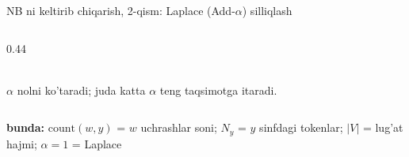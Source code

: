 \documentclass[aspectratio=169,11pt]{beamer}
\newcommand{\bunda}[1]{{\small\textbf{bunda:}\; #1}}
\begin{document}
\begin{frame}{NB ni keltirib chiqarish, 2-qism: Laplace (Add-$\alpha$) silliqlash}
\begin{columns}[T]
\begin{column}{0.44\textwidth}
\\[1pt]
      {\scriptsize\textcolor{halfgray}{$\alpha$ nolni ko'taradi; juda katta $\alpha$ teng taqsimotga itaradi.}}
    \end{column}
  \end{columns}
  \vspace{2pt}
  \bunda{%
    \footnotesize $\mathrm{count}(w,y)$ = $w$ uchrashlar soni;\;
    $N_y$ = $y$ sinfdagi tokenlar;\;
    $|V|$ = lug'at hajmi;\;
    $\alpha{=}1$ = Laplace%
  }
\end{frame}

%
\end{document}
